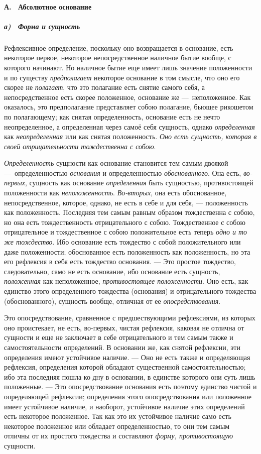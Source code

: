 \paragraph[А. \ Абсолютное основание]{А. \ Абсолютное основание}
\hypertarget{Toc478978721}{}\subparagraph[а) \ Форма и сущность]{а) \ Форма
и сущность}
\hypertarget{Toc478978722}{}Рефлексивное определение, поскольку оно
возвращается в основание, есть некоторое первое, некоторое непосредственное
наличное бытие вообще, с которого начинают. Но наличное бытие еще имеет
лишь значение положенности и по существу
{\em предполагает} некоторое основание в том смысле,
что оно его скорее не {\em полагает}, что это полагание
есть снятие самого себя, а непосредственное есть скорее положенное,
основание же —~неположенное. Как оказалось, это предполагание представляет
собою полагание, бьющее рикошетом по полагающему; как снятая
определенность, основание есть не нечто неопределенное, а определенная
через самоё себя сущность, однако {\em определенная}
как {\em неопределенная} или как снятая положенность.
{\em Оно есть сущность, которая в своей отрицательности
тождественна с собою}.

{\em Определенность} сущности как основание становится
тем самым двоякой —~определенностью {\em основания} и
определенностью {\em обоснованного}. Она есть,
{\em во-первых}, сущность как основание
{\em определенная} быть сущностью, противостоящей
положенности как {\em неположенность}.
{\em Во-вторых}, она есть обоснованное,
непосредственное, которое, однако, не есть в себе и для себя, —
положенность как положенность. Последняя тем самым равным образом
тождественна с собою, но она есть тождественность отрицательного с собою.
Тождественное с собою отрицательное и тождественное с собою положительное
есть теперь {\em одно и то же тождество}. Ибо основание
есть тождество с собой положительного или даже положенности; обоснованное
есть положенность как положенность, но эта его рефлексия в себя есть
тождество основания. — Это простое тождество, следовательно, само не есть
основание, ибо основание есть сущность,
{\em положенная} как неположенное,
{\em противостоящее положенности}. Оно есть, как
единство этого определенного тождества (основания) и отрицательного
тождества (обоснованного), сущность вообще, отличная от ее
{\em опосредствования}.

Это опосредствование, сравненное с предшествующими рефлексиями, из которых
оно проистекает, не есть, во-первых, чистая рефлексия, каковая не отлична
от сущности и еще не заключает в себе отрицательного и тем самым также и
самостоятельности определений. В основании же, как снятой рефлексии, эти
определения имеют устойчивое наличие. — Оно не есть также и определяющая
рефлексия, определения которой обладают существенной самостоятельностью;
ибо эта последняя пошла ко дну в основании, в единстве которого они суть
лишь положенные. — Это опосредствование основания есть поэтому единство
чистой и определяющей рефлексии; определения этого опосредствования или
положенное имеет устойчивое наличие, и наоборот, устойчивое наличие этих
определений есть некоторое положенное. Так как это их устойчивое наличие
само есть некоторое положенное или обладает определенностью, то они тем
самым отличны от их простого тождества и составляют
{\em форму, противостоящую} сущности.

